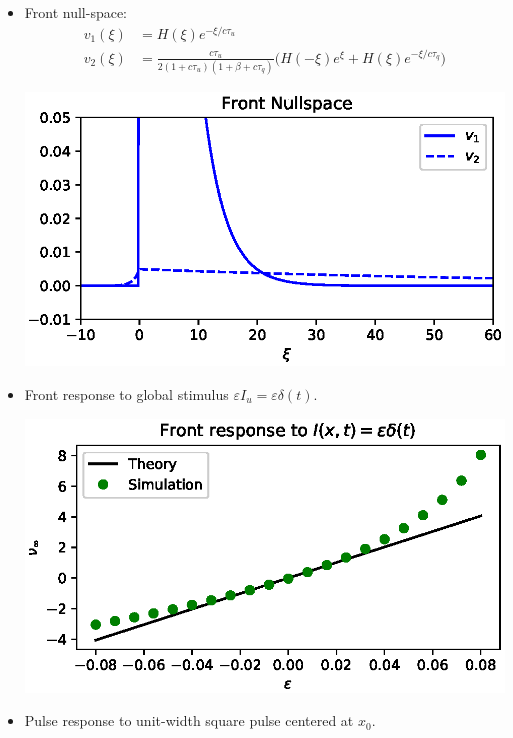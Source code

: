 \documentclass[landscape,final]{baposter}
\begin{document}
\begin{poster}
{
	\begin{itemize}
		\item Front null-space:
		\begin{align*}
			v_1(\xi) &= H(\xi) e^{-\xi/c\tau_u} \\
			v_2(\xi) &= \frac{c\tau_u}{2(1+c\tau_u)(1+\beta+c\tau_q)} \big( H(-\xi)e^{\xi} + H(\xi) e^{-\xi/c\tau_q} \big)
		\end{align*}
		\begin{center}
			\includegraphics[width=.9\linewidth, trim={0cm, .2cm, 0cm, .2cm}, clip=true]{nullspace}
		\end{center}
		\vspace{-.5cm}
		\item Front response to global stimulus $\varepsilon I_u = \varepsilon \delta(t)$.
		\begin{center}
			\includegraphics[width=.9\linewidth, trim={0cm, .2cm, 0cm, .2cm}, clip=true]{fig_spatially_homogeneous_limit}
		\end{center}
		\vspace{-.5cm}
		\item Pulse response to unit-width square pulse centered at $x_0$. 

\end{itemize}}
\end{poster}
\end{document}
